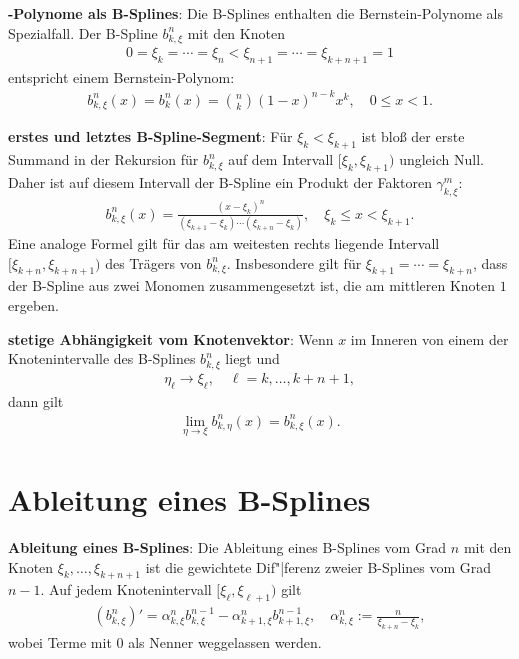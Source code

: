 \linie

\textbf{-Polynome als B-Splines}:
Die B-Splines enthalten die Bernstein-Polynome als Spezialfall.
Der B-Spline $b_{k,\xi}^n$ mit den Knoten
\begin{align*}
    0 = \xi_k = \dotsb = \xi_n < \xi_{n+1} = \dotsb = \xi_{k+n+1} = 1
\end{align*}
entspricht einem Bernstein-Polynom:
\begin{align*}
    b_{k,\xi}^n(x) = b_k^n(x) = \binom{n}{k} (1 - x)^{n - k} x^k,\quad 0 \le x < 1.
\end{align*}

\linie

\textbf{erstes und letztes B-Spline-Segment}:
Für $\xi_k < \xi_{k+1}$ ist bloß der erste Summand in der Rekursion für $b_{k,\xi}^n$
auf dem Intervall $[\xi_k, \xi_{k+1})$ ungleich Null.
Daher ist auf diesem Intervall der B-Spline ein Produkt der Faktoren $\gamma_{k,\xi}^m$:
\begin{align*}
    b_{k,\xi}^n(x) = \frac{(x - \xi_k)^n}{(\xi_{k+1} - \xi_k) \dotsm (\xi_{k+n} - \xi_k)},\quad
    \xi_k \le x < \xi_{k+1}.
\end{align*}
Eine analoge Formel gilt für das am weitesten rechts liegende Intervall $[\xi_{k+n}, \xi_{k+n+1})$
des Trägers von $b_{k,\xi}^n$.
Insbesondere gilt für $\xi_{k+1} = \dotsb = \xi_{k+n}$, dass der B-Spline aus zwei Monomen
zusammengesetzt ist, die am mittleren Knoten $1$ ergeben.

\linie

\textbf{stetige Abhängigkeit vom Knotenvektor}:
Wenn $x$ im Inneren von einem der Knotenintervalle des B-Splines $b_{k,\xi}^n$ liegt und
\begin{align*}
    \eta_\ell \to \xi_\ell,\quad \ell = k, \dotsc, k + n + 1,
\end{align*}
dann gilt
\begin{align*}
    \lim_{\eta \to \xi} b_{k,\eta}^n(x) = b_{k,\xi}^n(x).
\end{align*}

\section{%
    Ableitung eines B-Splines%
}

\textbf{Ableitung eines B-Splines}:
Die Ableitung eines B-Splines vom Grad $n$ mit den Knoten $\xi_k, \dotsc, \xi_{k+n+1}$
ist die gewichtete Dif"|ferenz zweier B-Splines vom Grad $n - 1$.
Auf jedem Knotenintervall $[\xi_\ell, \xi_{\ell+1})$ gilt
\begin{align*}
    (b_{k,\xi}^n)' = \alpha_{k,\xi}^n b_{k,\xi}^{n-1} - \alpha_{k+1,\xi}^n b_{k+1,\xi}^{n-1},\quad
    \alpha_{k,\xi}^n := \frac{n}{\xi_{k+n} - \xi_k},
\end{align*}
wobei Terme mit $0$ als Nenner weggelassen werden.

